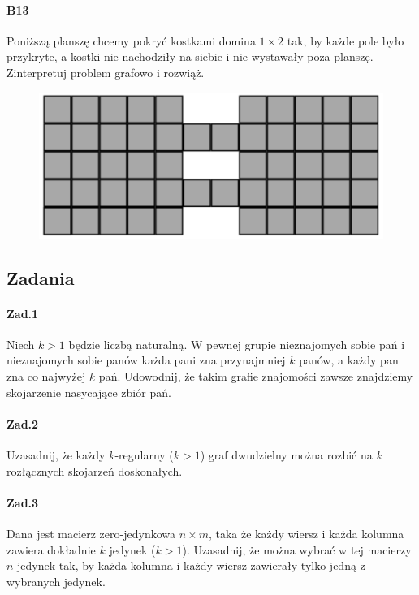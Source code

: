 \paragraph{B13} Poniższą planszę chcemy pokryć kostkami domina $1 \times 2$ tak, by każde pole było przykryte, a kostki nie nachodziły na siebie i nie wystawały poza planszę. Zinterpretuj problem grafowo i rozwiąż.

\begin{figure}[H]
\centering
\includegraphics[width=.9\textwidth]{img/2_B13}
\end{figure}


\subsection{Zadania}
\paragraph{Zad.1} Niech $k > 1$ będzie liczbą naturalną. W pewnej grupie nieznajomych sobie pań i nieznajomych sobie panów każda pani zna przynajmniej $k$ panów, a każdy pan zna co najwyżej $k$ pań. Udowodnij, że takim grafie znajomości zawsze znajdziemy skojarzenie nasycające zbiór pań.
\paragraph{Zad.2} Uzasadnij, że każdy $k$-regularny ($k > 1$) graf dwudzielny można rozbić na $k$ rozłącznych skojarzeń doskonałych.
\paragraph{Zad.3} Dana jest macierz zero-jedynkowa $n \times m$, taka że każdy wiersz i każda kolumna zawiera dokładnie $k$ jedynek ($k > 1$). Uzasadnij, że można wybrać w tej macierzy $n$ jedynek tak, by każda kolumna i każdy wiersz zawierały tylko jedną z wybranych jedynek.
